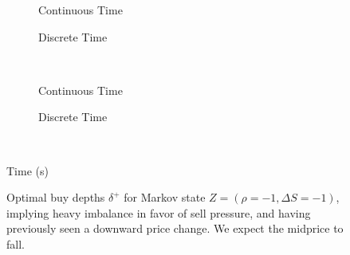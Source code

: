 \begin{figure}
\centering
\begin{subfigure}{.45\linewidth}
  \centering
  \setlength\figureheight{\linewidth} 
  \setlength\figurewidth{\linewidth}
  
  \caption{Continuous Time}
\end{subfigure}%
\hfill%
\begin{subfigure}{.45\linewidth}
  \centering
  \setlength\figureheight{\linewidth} 
  \setlength\figurewidth{\linewidth}
   
  \caption{Discrete Time}
\end{subfigure}\\
\vspace{1cm}
\begin{subfigure}{.45\linewidth}
  \centering
  \setlength\figureheight{\linewidth} 
  \setlength\figurewidth{\linewidth}
  
  \caption{Continuous Time}
\end{subfigure}%
\hfill%
\begin{subfigure}{.45\linewidth}
  \centering
  \setlength\figureheight{\linewidth} 
  \setlength\figurewidth{\linewidth}
   
  \caption{Discrete Time}
\end{subfigure}\\

\leavevmode{}\hspace{0pt plus 1filll}\null

Time (s)

\vspace{1cm}
\begin{subfigure}{\linewidth}
  \centering
   
\end{subfigure}%
  \caption{Optimal buy depths $\delta^{+}$ for Markov state $Z=(\rho = -1, \Delta S = -1)$, implying heavy imbalance in favor of sell pressure, and having previously seen a downward price change. We expect the midprice to fall.}
  \label{fig:comp_dp_z1_test}
\end{figure}

